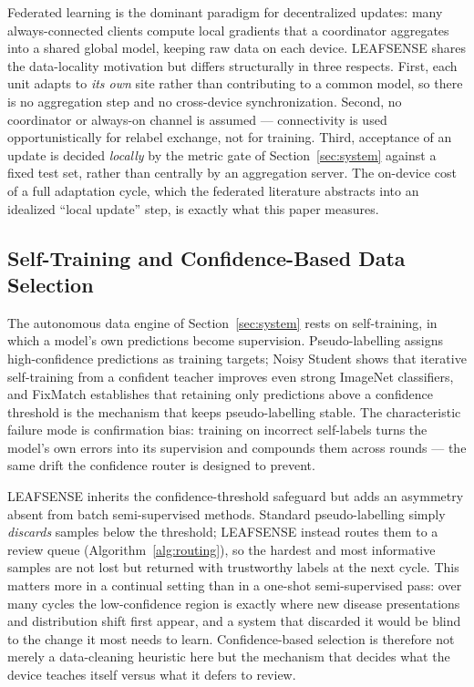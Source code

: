 \documentclass[journal]{IEEEtran}
\begin{document}
Federated learning \cite{ref31} is the dominant paradigm for decentralized updates:
many always-connected clients compute local gradients that a coordinator aggregates
into a shared global model, keeping raw data on each device. LEAFSENSE shares the
data-locality motivation but differs structurally in three respects. First, each unit
adapts to \emph{its own} site rather than contributing to a common model, so there is
no aggregation step and no cross-device synchronization. Second, no coordinator or
always-on channel is assumed --- connectivity is used opportunistically for relabel
exchange, not for training. Third, acceptance of an update is decided \emph{locally}
by the metric gate of Section~\ref{sec:system} against a fixed test set, rather than
centrally by an aggregation server. The on-device cost of a full adaptation cycle,
which the federated literature abstracts into an idealized ``local update'' step, is
exactly what this paper measures.

\subsection{Self-Training and Confidence-Based Data Selection}

The autonomous data engine of Section~\ref{sec:system} rests on self-training, in
which a model's own predictions become supervision. Pseudo-labelling assigns
high-confidence predictions as training targets; Noisy Student \cite{ref32} shows
that iterative self-training from a confident teacher improves even strong ImageNet
classifiers, and FixMatch \cite{ref33} establishes that retaining only predictions
above a confidence threshold is the mechanism that keeps pseudo-labelling stable. The
characteristic failure mode is confirmation bias: training on incorrect self-labels
turns the model's own errors into its supervision and compounds them across rounds ---
the same drift the confidence router is designed to prevent.

LEAFSENSE inherits the confidence-threshold safeguard but adds an asymmetry absent
from batch semi-supervised methods. Standard pseudo-labelling simply \emph{discards}
samples below the threshold; LEAFSENSE instead routes them to a review queue
(Algorithm~\ref{alg:routing}), so the hardest and most informative samples are not
lost but returned with trustworthy labels at the next cycle. This matters more in a
continual setting than in a one-shot semi-supervised pass: over many cycles the
low-confidence region is exactly where new disease presentations and distribution
shift first appear, and a system that discarded it would be blind to the change it
most needs to learn. Confidence-based selection is therefore not merely a
data-cleaning heuristic here but the mechanism that decides what the device teaches
itself versus what it defers to review.
\end{document}
